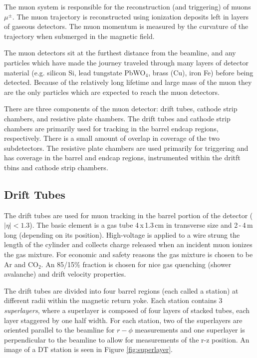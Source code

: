 The muon system is responsible for the reconstruction (and triggering) of muons $\mu^{\pm}$. The muon trajectory is reconstructed using ionization deposits left in layers of gaseous detectors. The muon momentum is measured by the curvature of the trajectory when submerged in the magnetic field.\cite{muontdr}

The muon detectors sit at the furthest distance from the beamline, and any particles which have made the journey traveled through many layers of detector material (e.g. silicon Si, lead tungstate PbWO$_{4}$, brass (Cu), iron Fe) before being detected. Because of the relatively long lifetime and large mass of the muon they are the only particles which are expected to reach the muon detectors.

There are three components of the muon detector: drift tubes, cathode strip chambers, and resistive plate chambers. The drift tubes and cathode strip chambers are primarily used for tracking in the barrel endcap regions, respectively. There is a small amount of overlap in coverage of the two subdetectors. The resistive plate chambers are used primarily for triggering and has coverage in the barrel and endcap regions, instrumented within the dritft tbins and cathode strip chambers.

\subsection{Drift Tubes}

The drift tubes are used for muon tracking in the barrel portion of the detector ($|\eta|<1.3$). The basic element is a gas tube 4$\,$x$\,$1.3$\,$cm in transverse size and 2$\,$-$\,$4$\,$m long (depending on its position). High-voltage is applied to a wire strung the length of the cylinder and collects charge released when an incident muon ionizes the gas mixture. For economic and safety reasons the gas mixture is chosen to be Ar and CO$_{2}$. An 85/15\% fraction is chosen for nice gas quenching (shower avalanche) and drift velocity properties. \cite{dtperformance}

The drift tubes are divided into four barrel regions (each called a station) at different radii within the magnetic return yoke. Each station contains 3 \textit{superlayers}, where a superlayer is composed of four layers of stacked tubes, each layer staggered by one half width. For each station, two of the superlayers are oriented parallel to the beamline for $r-\phi$ measurements and one superlayer is perpendicular to the beamline to allow for measurements of the r-z position. An image of a DT station is seen in Figure \ref{fig:superlayer}.

